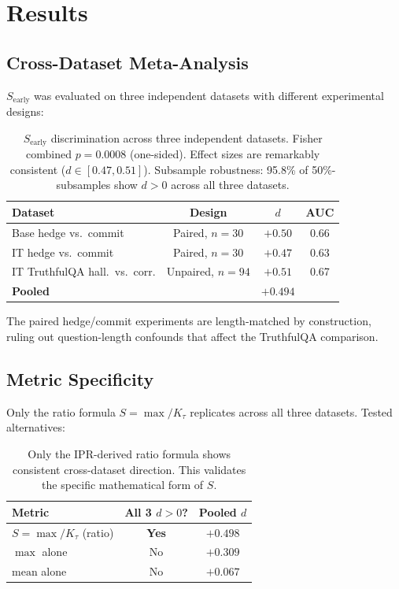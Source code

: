\documentclass{article}
\begin{document}
\section{Results}
\label{sec:results}

\subsection{Cross-Dataset Meta-Analysis}

$S_\text{early}$ was evaluated on three independent datasets with
different experimental designs:

\begin{table}[h]
\centering
\small
\begin{tabular}{lccc}
\toprule
Dataset & Design & $d$ & AUC \\
\midrule
Base hedge vs.\ commit & Paired, $n=30$ & $+0.50$ & 0.66 \\
IT hedge vs.\ commit & Paired, $n=30$ & $+0.47$ & 0.63 \\
IT TruthfulQA hall.\ vs.\ corr. & Unpaired, $n=94$ & $+0.51$ & 0.67 \\
\midrule
\textbf{Pooled} & & \textbf{$+0.494$} & \\
\bottomrule
\end{tabular}
\caption{$S_\text{early}$ discrimination across three independent
datasets. Fisher combined $p = 0.0008$ (one-sided). Effect sizes
are remarkably consistent ($d \in [0.47, 0.51]$). Subsample robustness:
95.8\% of 50\%-subsamples show $d > 0$ across all three datasets.}
\label{tab:meta}
\end{table}

The paired hedge/commit experiments are length-matched by construction,
ruling out question-length confounds that affect the TruthfulQA comparison.

\subsection{Metric Specificity}

Only the ratio formula $S = \max / K_\tau$ replicates across all three
datasets. Tested alternatives:

\begin{table}[h]
\centering
\small
\begin{tabular}{lcc}
\toprule
Metric & All 3 $d > 0$? & Pooled $d$ \\
\midrule
$S = \max / K_\tau$ (ratio) & \textbf{Yes} & $+0.498$ \\
$\max$ alone & No & $+0.309$ \\
$\text{mean}$ alone & No & $+0.067$ \\
\bottomrule
\end{tabular}
\caption{Only the IPR-derived ratio formula shows consistent cross-dataset
direction. This validates the specific mathematical form of $S$.}
\label{tab:specificity}
\end{table}
\end{document}

